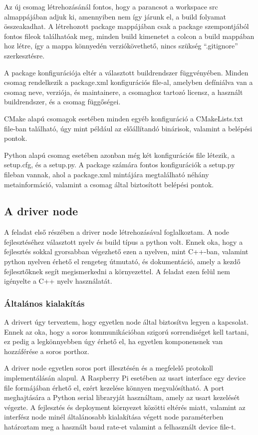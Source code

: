 Az új csomag létrehozásánál fontos, hogy a parancsot a workspace src almappájában
adjuk ki, amennyiben nem így járunk el, a build folyamat összeakadhat. A
létrehozott package mappájában csak a package szempontjából fontos fileok
találhatóak meg, minden build kimenetet a colcon a build mappában hoz létre, így
a mappa könnyedén verziókövethető, nincs szükség ``.gitignore'' szerkesztésre.

A package konfigurációja eltér a választott buildrendszer függvényében. Minden
csomag rendelkezik a package.xml konfigurációs file-al, amelyben defíniálva van a
csomag neve, verziója, és maintainere, a csomaghoz tartozó licensz, a használt
buildrendszer, és a csomag függőségei. 

CMake alapú csomagok esetében minden egyéb konfiguráció a CMakeLists.txt file-ban
található, úgy mint például az előállítandó binárisok, valamint a belépési
pontok.

Python alapú csomag esetében azonban még két konfigurációs file létezik, a
setup.cfg, és a setup.py. A package számára fontos konfigurációk a setup.py
fileban vannak, ahol a package.xml mintájára megtalálható néhány metainformáció,
valamint a csomag által biztosított belépési pontok.

\subsection{A driver node}

A feladat első részében a driver node létrehozásával foglalkoztam. A node
fejlesztéséhez választott nyelv és build típus a python volt. Ennek oka, hogy a
fejlesztés sokkal gyorsabban végezhető ezen a nyelven, mint C++-ban, valamint
python nyelven érhető el rengeteg útmutató, és dokumentáció, amely a kezdő
fejlesztőknek segít megismerkedni a környezettel. A feladat ezen felül nem
igényelte a C++ nyelv használatát.

\subsubsection{Általános kialakítás}

A drivert úgy terveztem, hogy egyetlen node által biztosítva legyen a
kapcsolat. Ennek az oka, hogy a soros kommunikációban szigorú sorrendiséget kell
tartani, ez pedig a legkönnyebben úgy érhető el, ha egyetlen komponensnek van
hozzáférése a soros porthoz.

A driver node egyetlen soros port illesztésén és a megfelelő protokoll
implementálásán alapul. A Raspberry Pi esetében az usart interface egy device
file formájában érhető el, ezért kezelése könnyen megvalósítható. A port
meghajtására a Python serial libraryját használtam, amely az usart kezelését
végezte. A fejlesztés és deployment környezet közötti eltérés miatt, valamint az
interfész node minél általánosabb kialakítása végett node paraméterben határoztam
meg a használt baud rate-et valamint a felhasznált device file-t.

